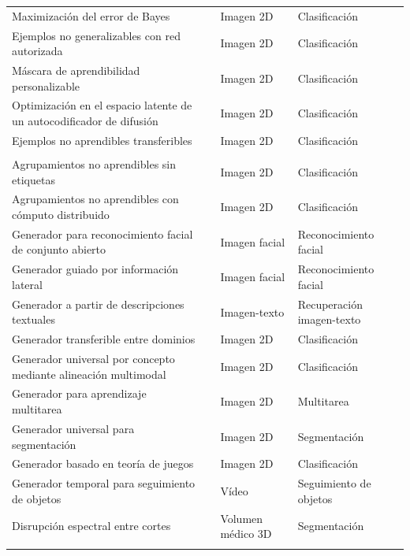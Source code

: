 \begin{footnotesize}
\begin{longtable}{@{}L{6.2cm}L{1.0cm}L{2.2cm}L{3.0cm}@{}}
\quad Maximización del error de Bayes & \cite{S0023} & Imagen 2D & Clasificación \\
\quad Ejemplos no generalizables con red autorizada & \cite{S0030} & Imagen 2D & Clasificación \\
\quad Máscara de aprendibilidad personalizable & \cite{S0066} & Imagen 2D & Clasificación \\
\quad Optimización en el espacio latente de un autocodificador de difusión & \cite{S0061} & Imagen 2D & Clasificación \\
\quad Ejemplos no aprendibles transferibles & \cite{S0101} & Imagen 2D & Clasificación \\
\addlinespace
{}\\
\quad Agrupamientos no aprendibles sin etiquetas & \cite{S0003} & Imagen 2D & Clasificación \\
\quad Agrupamientos no aprendibles con cómputo distribuido & \cite{S0154} & Imagen 2D & Clasificación \\
\quad Generador para reconocimiento facial de conjunto abierto & \cite{S0020} & Imagen facial & Reconocimiento facial \\
\quad Generador guiado por información lateral & \cite{S0038} & Imagen facial & Reconocimiento facial \\
\quad Generador a partir de descripciones textuales & \cite{S0039} & Imagen-texto & Recuperación imagen-texto \\
\quad Generador transferible entre dominios & \cite{S0056} & Imagen 2D & Clasificación \\
\quad Generador universal por concepto mediante alineación multimodal & \cite{S0062} & Imagen 2D & Clasificación \\
\quad Generador para aprendizaje multitarea & \cite{S0072} & Imagen 2D & Multitarea \\
\quad Generador universal para segmentación & \cite{S0074} & Imagen 2D & Segmentación \\
\quad Generador basado en teoría de juegos & \cite{S0088} & Imagen 2D & Clasificación \\
\quad Generador temporal para seguimiento de objetos & \cite{S0151} & Vídeo & Seguimiento de objetos \\
\quad Disrupción espectral entre cortes & \cite{S0202} & Volumen médico 3D & Segmentación \\
\addlinespace
{}\\

\end{longtable}
\end{footnotesize}
